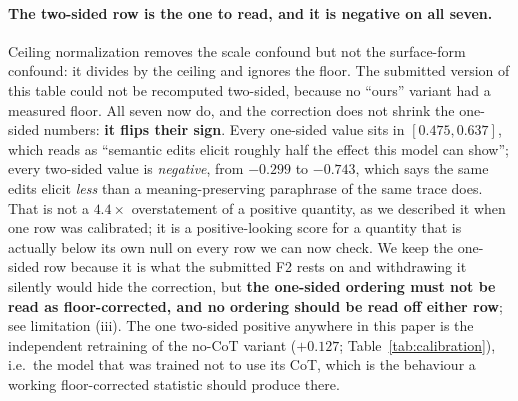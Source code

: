 \documentclass{article}
\begin{document}
\paragraph{The two-sided row is the one to read, and it is negative on all seven.} Ceiling normalization removes the scale confound but not the surface-form confound: it divides by the ceiling and ignores the floor. The submitted version of this table could not be recomputed two-sided, because no ``ours'' variant had a measured floor. All seven now do, and the correction does not shrink the one-sided numbers: \textbf{it flips their sign}. Every one-sided value sits in $[0.475, 0.637]$, which reads as ``semantic edits elicit roughly half the effect this model can show''; every two-sided value is \emph{negative}, from $-0.299$ to $-0.743$, which says the same edits elicit \emph{less} than a meaning-preserving paraphrase of the same trace does. That is not a $4.4\times$ overstatement of a positive quantity, as we described it when one row was calibrated; it is a positive-looking score for a quantity that is actually below its own null on every row we can now check. We keep the one-sided row because it is what the submitted F2 rests on and withdrawing it silently would hide the correction, but \textbf{the one-sided ordering must not be read as floor-corrected, and no ordering should be read off either row}; see limitation (iii). The one two-sided positive anywhere in this paper is the independent retraining of the no-CoT variant ($+0.127$; Table~\ref{tab:calibration}), i.e.\ the model that was trained not to use its CoT, which is the behaviour a working floor-corrected statistic should produce there.
\end{document}

